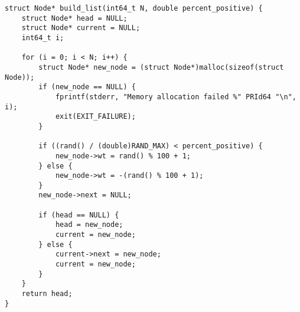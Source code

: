 \begin{lstlisting}[style=CStyle]
struct Node* build_list(int64_t N, double percent_positive) {
    struct Node* head = NULL;
    struct Node* current = NULL;
    int64_t i;

    for (i = 0; i < N; i++) {
        struct Node* new_node = (struct Node*)malloc(sizeof(struct Node));
        if (new_node == NULL) {
            fprintf(stderr, "Memory allocation failed %" PRId64 "\n", i);
            exit(EXIT_FAILURE);
        }

        if ((rand() / (double)RAND_MAX) < percent_positive) {
            new_node->wt = rand() % 100 + 1;
        } else {
            new_node->wt = -(rand() % 100 + 1);
        }
        new_node->next = NULL;

        if (head == NULL) {
            head = new_node;
            current = new_node;
        } else {
            current->next = new_node;
            current = new_node;
        }
    }
    return head;
}
\end{lstlisting}